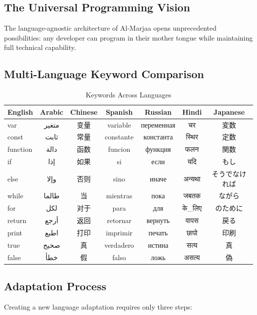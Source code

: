 \documentclass[11pt,a4paper]{article}
\begin{document}
\subsection{The Universal Programming Vision}

The language-agnostic architecture of Al-Marjaa opens unprecedented possibilities: any developer can program in their mother tongue while maintaining full technical capability.

\subsection{Multi-Language Keyword Comparison}

\begin{table}[h]
\centering
\caption{Keywords Across Languages}
\label{tab:keywords-multi}
\scriptsize
\begin{tabular}{@{}lcccccc@{}}
\toprule
\textbf{English} & \textbf{Arabic} & \textbf{Chinese} & \textbf{Spanish} & \textbf{Russian} & \textbf{Hindi} & \textbf{Japanese} \\
\midrule
var & متغير & 变量 & variable & переменная & चर & 変数 \\
const & ثابت & 常量 & constante & константа & स्थिर & 定数 \\
function & دالة & 函数 & funcion & функция & फलन & 関数 \\
if & إذا & 如果 & si & если & यदि & もし \\
else & وإلا & 否则 & sino & иначе & अन्यथा & そうでなければ \\
while & طالما & 当 & mientras & пока & जबतक & ながら \\
for & لكل & 对于 & para & для & के\_लिए & のために \\
return & أرجع & 返回 & retornar & вернуть & वापस & 戻る \\
print & اطبع & 打印 & imprimir & печать & छापो & 印刷 \\
true & صحيح & 真 & verdadero & истина & सत्य & 真 \\
false & خطأ & 假 & falso & ложь & असत्य & 偽 \\
\bottomrule
\end{tabular}
\end{table}

\subsection{Adaptation Process}

Creating a new language adaptation requires only three steps:
\end{document}
